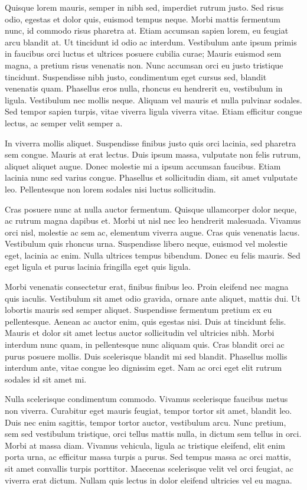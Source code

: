 \documentclass[sigconf]{acmart}
\begin{document}
Quisque lorem mauris, semper in nibh sed, imperdiet rutrum justo. Sed risus odio, egestas et dolor quis, euismod tempus neque. Morbi mattis fermentum nunc, id commodo risus pharetra at. Etiam accumsan sapien lorem, eu feugiat arcu blandit at. Ut tincidunt id odio ac interdum. Vestibulum ante ipsum primis in faucibus orci luctus et ultrices posuere cubilia curae; Mauris euismod sem magna, a pretium risus venenatis non. Nunc accumsan orci eu justo tristique tincidunt. Suspendisse nibh justo, condimentum eget cursus sed, blandit venenatis quam. Phasellus eros nulla, rhoncus eu hendrerit eu, vestibulum in ligula. Vestibulum nec mollis neque. Aliquam vel mauris et nulla pulvinar sodales. Sed tempor sapien turpis, vitae viverra ligula viverra vitae. Etiam efficitur congue lectus, ac semper velit semper a.

In viverra mollis aliquet. Suspendisse finibus justo quis orci lacinia, sed pharetra sem congue. Mauris at erat lectus. Duis ipsum massa, vulputate non felis rutrum, aliquet aliquet augue. Donec molestie mi a ipsum accumsan faucibus. Etiam lacinia nunc sed varius congue. Phasellus et sollicitudin diam, sit amet vulputate leo. Pellentesque non lorem sodales nisi luctus sollicitudin.

Cras posuere nunc at nulla auctor fermentum. Quisque ullamcorper dolor neque, ac rutrum magna dapibus et. Morbi ut nisl nec leo hendrerit malesuada. Vivamus orci nisl, molestie ac sem ac, elementum viverra augue. Cras quis venenatis lacus. Vestibulum quis rhoncus urna. Suspendisse libero neque, euismod vel molestie eget, lacinia ac enim. Nulla ultrices tempus bibendum. Donec eu felis mauris. Sed eget ligula et purus lacinia fringilla eget quis ligula.

Morbi venenatis consectetur erat, finibus finibus leo. Proin eleifend nec magna quis iaculis. Vestibulum sit amet odio gravida, ornare ante aliquet, mattis dui. Ut lobortis mauris sed semper aliquet. Suspendisse fermentum pretium ex eu pellentesque. Aenean ac auctor enim, quis egestas nisi. Duis at tincidunt felis. Mauris et dolor sit amet lectus auctor sollicitudin vel ultricies nibh. Morbi interdum nunc quam, in pellentesque nunc aliquam quis. Cras blandit orci ac purus posuere mollis. Duis scelerisque blandit mi sed blandit. Phasellus mollis interdum ante, vitae congue leo dignissim eget. Nam ac orci eget elit rutrum sodales id sit amet mi.

Nulla scelerisque condimentum commodo. Vivamus scelerisque faucibus metus non viverra. Curabitur eget mauris feugiat, tempor tortor sit amet, blandit leo. Duis nec enim sagittis, tempor tortor auctor, vestibulum arcu. Nunc pretium, sem sed vestibulum tristique, orci tellus mattis nulla, in dictum sem tellus in orci. Morbi at massa diam. Vivamus vehicula, ligula ac tristique eleifend, elit enim porta urna, ac efficitur massa turpis a purus. Sed tempus massa ac orci mattis, sit amet convallis turpis porttitor. Maecenas scelerisque velit vel orci feugiat, ac viverra erat dictum. Nullam quis lectus in dolor eleifend ultricies vel eu magna.
\end{document}
